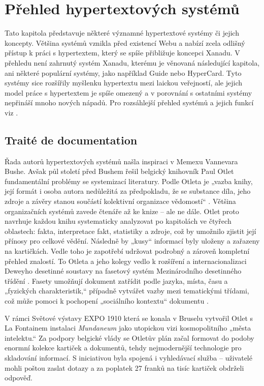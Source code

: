 \chapter{Přehled hypertextových systémů}

Tato kapitola představuje některé významné hypertextové systémy či jejich koncepty. Většina systémů vznikla před existencí Webu a nabízí zcela odlišný přístup k práci s hypertextem, který se spíše přibližuje koncepci Xanadu. V přehledu není zahrnutý systém Xanadu, kterému je věnovaná následující kapitola, ani některé populární systémy, jako například Guide nebo HyperCard. Tyto systémy sice rozšířily myšlenku hypertextu mezi laickou veřejností, ale jejich model práce s hypertextem je spíše omezený a v porovnání s ostatními systémy nepřináší mnoho nových nápadů. Pro rozsáhlejší přehled systémů a jejich funkcí viz \textcites{Conklin1987}{Nielsen1995}{Muller-Prove2002}.

\section{Traité de documentation}

Řada autorů hypertextových systémů našla inspiraci v Memexu Vannevara Bushe. Avšak půl století před Bushem řešil belgický knihovník Paul Otlet fundamentální problémy se systemizací literatury. Podle Otleta je „vazba knihy, její formát i osoba autora nedůležitá za předpokladu, že se substance díla, jeho zdroje a závěry stanou součástí kolektivní organizace vědomostí“ \autocite[237]{Rayward1994}. Většina organizačních systémů zavede čtenáře až ke knize -- ale ne dále.
Otlet proto navrhuje každou knihu systematicky analyzovat po kapitolách ve čtyřech oblastech: fakta, interpretace fakt, statistiky a zdroje, což by umožnilo zjistit její přínosy pro celkové vědění. Následně by „kusy“ informací byly uloženy a zařazeny na kartičkách. Vedle toho je zapotřebí udržovat podrobný a zároveň kompletní přehled znalostí. To Otleta a jeho kolegy vedlo k rozšíření a internacionalizaci Deweyho desetinné soustavy na fasetový systém Mezinárodního desetinného třídění \autocite[238]{Rayward1994}. Fasety umožňují dokument zatřídit podle jazyka, místa, času a „fyzických charakteristik,“ případně vytvářet vazby mezi tematickými třídami, což může pomoci k pochopení „sociálního kontextu“ dokumentu \autocite[188]{Wright2007}.

V rámci Světové výstavy EXPO 1910 která se konala v Bruselu vytvořil Otlet s La Fontainem instalaci \textit{Mundaneum} jako utopickou vizi kosmopolitního „města intelektu.“ Za podpory belgické vlády se Otletův plán začal formovat do podoby enormní kolekce kartiček a dokumentů, tehdy nejmodernější technologie pro skladování informací. S iniciativou byla spojená i vyhledávací služba – uživatelé mohli poštou zaslat dotazy a za poplatek 27 franků na tisíc kartiček obdrželi odpověď. \autocite[188--189]{Wright2007}

